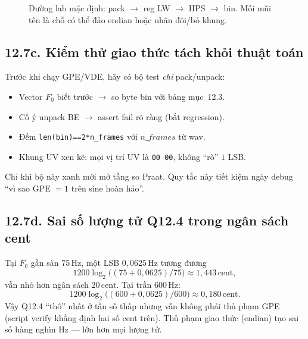 \begin{figure}[H]
\centering
{}
\caption{Đường lab mặc định: pack $\to$ reg LW $\to$ HPS $\to$ bin. Mỗi mũi tên là chỗ có thể đảo endian hoặc nhân đôi/bỏ khung.}
\label{fig:ch12_hps_path}
\end{figure}

\subsection*{12.7c. Kiểm thử giao thức tách khỏi thuật toán}

Trước khi chạy GPE/VDE, hãy có bộ test \emph{chỉ} pack/unpack:
\begin{itemize}[leftmargin=1.4em]
  \item Vector $F_0$ biết trước $\to$ so byte bin với bảng mục~12.3.
  \item Cố ý unpack BE $\to$ assert fail rõ ràng (bắt regression).
  \item Đếm \texttt{len(bin)==2*n\_frames} với $n\_frames$ từ wav.
  \item Khung UV xen kẽ: mọi vị trí UV là \texttt{00 00}, không ``rò'' $1$ LSB.
\end{itemize}
Chỉ khi bộ này xanh mới mở tầng so Praat. Quy tắc này tiết kiệm ngày debug ``vì sao GPE $=1$ trên sine hoàn hảo''.


\subsection*{12.7d. Sai số lượng tử Q12.4 trong ngân sách cent}

Tại $F_0$ gần sàn $75\,\text{Hz}$, một LSB $0{,}0625\,\text{Hz}$ tương đương
\[
1200\log_2\bigl((75+0{,}0625)/75\bigr)\approx 1{,}443\,\text{cent},
\]
vẫn nhỏ hơn ngân sách $20\,\text{cent}$. Tại trần $600\,\text{Hz}$:
\[
1200\log_2\bigl((600+0{,}0625)/600\bigr)\approx 0{,}180\,\text{cent}.
\]
Vậy Q12.4 ``thô'' nhất ở tần số thấp nhưng vẫn không phải thủ phạm GPE (script verify khẳng định hai số cent trên). Thủ phạm giao thức (endian) tạo sai số hàng nghìn Hz --- lớn hơn mọi lượng tử.

